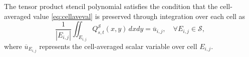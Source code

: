 The tensor product stencil polynomial satisfies the condition that the cell-averaged
value \eqref{eq:cellaveval} is preserved through integration over each cell as
\begin{equation}\label{eq:stencilpolycoefficent}
		  \frac{1}{|E_{i,j}|} \iint_{E_{i,j}} Q^{\mathcal{S}}_{s,t}(x,y)\, dxdy = \overline{u}_{i,j}, \quad 
		  \forall E_{i,j} \in \mathcal{S},
\end{equation}
where $\overline{u}_{E_{i,j}}$ represents the cell-averaged scalar variable over cell $E_{i,j}$.

